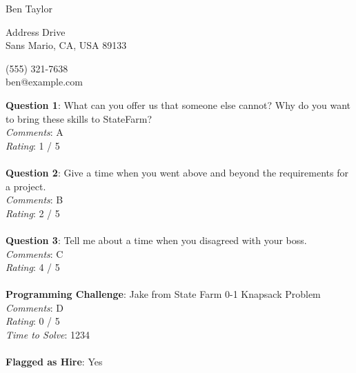\documentclass[12pt]{article}
\begin{document}
{\LARGE \begin{center}Ben Taylor\end{center}}

\begin{multicols}{2}
 Address Drive \\
Sans Mario, CA, USA 89133
\columnbreak

\noindent
(555) 321-7638 \\
ben@example.com
\end{multicols}

\noindent
\textbf{Question 1}: What can you offer us that someone else cannot? Why do you want to bring these skills to StateFarm?
\\\noindent
\textit{Comments}: A
\\\noindent
\textit{Rating}: 1 / 5
\\\\
\noindent
\textbf{Question 2}: Give a time when you went above and beyond the requirements for a project.
\\\noindent
\textit{Comments}: B
\\\noindent
\textit{Rating}: 2 / 5
\\\\
\noindent
\textbf{Question 3}: Tell me about a time when you disagreed with your boss.
\\\noindent
\textit{Comments}: C
\\\noindent
\textit{Rating}: 4 / 5
\\\\
\noindent
\textbf{Programming Challenge}: Jake from State Farm 0-1 Knapsack Problem
\\\noindent
\textit{Comments}: D
\\\noindent
\textit{Rating}: 0 / 5
\\\noindent
\textit{Time to Solve}: 1234
\\\\
\textbf{Flagged as Hire}: Yes
\\\\ 
\end{document}
